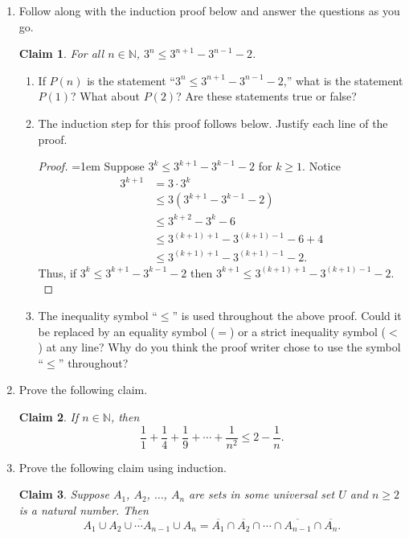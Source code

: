 \documentclass[12 pt]{article}
\newcommand{\N}{\mathbb{N}}
\renewcommand{\c}[1]{\overline{#1}}
\theoremstyle{definition}
\theoremstyle{plain}
\theoremstyle{mytheorem}
\newtheorem{claim}{Claim}
\theoremstyle{myexample}
\theoremstyle{mydefinition}
\begin{document}
\begin{enumerate}
\item Follow along with the induction proof below and answer the questions as you go.

\begin{claim}
For all $n\in \N$, $3^n \leq 3^{n+1}-3^{n-1}-2$.
\end{claim}

\begin{enumerate}
\item If $P(n)$ is the statement ``$3^n \leq 3^{n+1}-3^{n-1}-2$,'' what is the statement $P(1)$?  What about $P(2)$?  Are these statements true or false?

\vspace{2in}

\item The induction step for this proof follows below.  Justify each line of the proof.
\begin{proof} \openup=1em Suppose $3^k \leq 3^{k+1}-3^{k-1}-2$ for $k \geq 1$.  Notice
\begin{align*}
3^{k+1} &= 3 \cdot 3^k \\
\ &\leq 3(3^{k+1}-3^{k-1}-2)\\
\ &\leq 3^{k+2}-3^k-6 \\
\ &\leq 3^{(k+1)+1} - 3^{(k+1)-1} -6 +4 \\
\ &\leq 3^{(k+1)+1} - 3^{(k+1)-1}-2.
\end{align*}
Thus, if $3^k \leq 3^{k+1}-3^{k-1}-2$ then $3^{k+1} \leq 3^{(k+1)+1} - 3^{(k+1)-1}-2.$
\end{proof}


\item The inequality symbol ``$\leq$'' is used throughout the above proof.  Could it be replaced by an equality symbol ($=$) or a strict inequality symbol ($<$) at any line?  Why do you think the proof writer chose to use the symbol ``$\leq$'' throughout?

\vspace{2in}

\end{enumerate}

\newpage

\item Prove the following claim.
\begin{claim}
If $n \in \N$, then \[\frac{1}{1}+\frac{1}{4}+\frac{1}{9} + \cdots + \frac{1}{n^2} \leq 2 - \frac{1}{n}.\]
\end{claim}
\newpage

\item Prove the following claim using induction.
\begin{claim}
Suppose $A_1$, $A_2$, $\ldots$, $A_n$ are sets in some universal set $U$ and $n\geq 2$ is a natural number.  Then
\[\c{A_1 \cup A_2 \cup \cdots A_{n-1} \cup A_n}=\c{A_1} \cap \c{A_2} \cap \cdots \cap \c{A_{n-1}} \cap \c{A_n}.\]
\end{claim}
\end{enumerate}
\end{document}

